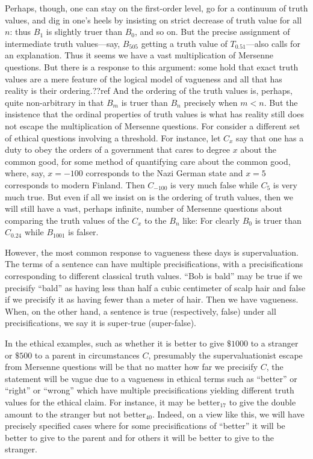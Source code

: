 Perhaps, though, one can stay on the first-order level, go for a continuum of truth values, and dig in one's heels 
by insisting on strict decrease of truth value for all $n$: thus $B_1$ is slightly truer than $B_0$, and so on. 
But the precise assignment of 
intermediate truth values---say, $B_{505}$ getting a truth value of $T_{0.51}$---also calls for an explanation. Thus it seems we have a vast multiplication
of Mersenne questions. But there is a response to this argument: some hold that exact truth values are a mere 
feature of the logical model of vagueness and all that has reality is their ordering.??ref And
the ordering of the truth values is, perhaps, quite non-arbitrary in that $B_{m}$ is truer than $B_n$ precisely when $m<n$. But the insistence that the ordinal
properties of truth values is what has reality still does not escape the multiplication of Mersenne questions. For consider a different set of ethical
questions involving a threshold. For instance, let $C_x$ say that one has a duty to obey the orders of a government that cares to degree $x$ about the common
good, for some method of quantifying care about the common good, where, say, $x=-100$ corresponds to the Nazi German state and $x=5$ corresponds to modern
Finland. Then $C_{-100}$ is very much false while $C_{5}$ is very much true. But even if all we insist on is the ordering of truth values, then we will still have a vast,
perhaps infinite, number of Mersenne  questions about comparing the truth values of the $C_x$ to the $B_n$ like: 
For clearly $B_0$ is truer than $C_{0.24}$ while $B_{1001}$ is falser.

However, the most common response to vagueness these days is supervaluation. The terms of a sentence can have multiple precisifications,
with a precisifications corresponding to different classical truth values. ``Bob is bald'' may be
true if we precisify ``bald'' as having less than half a cubic centimeter of scalp hair and false if we precisify it as
having fewer than a meter of hair. Then we have vagueness. When, on the other hand, a sentence is true (respectively, false) under all precisifications,
we say it is super-true (super-false).

In the ethical examples, such as whether it is better to give $ \$1000$ to a stranger or $ \$500$ to a parent in circumstances $C$, presumably the 
supervaluationist escape from Mersenne questions will be that no matter how far we precisify $C$, the statement will be vague due to a vagueness in 
ethical terms such as ``better'' or ``right'' or ``wrong'' which have multiple precisifications yielding different truth values for the ethical
claim. For instance, it may be better$_{17}$ to give the double amount to the stranger but not better$_{40}$. Indeed, on a view like this, we will have precisely specified cases where for some precisifications of ``better'' it will be better to 
give to the parent and for others it will be better to give to the stranger.

